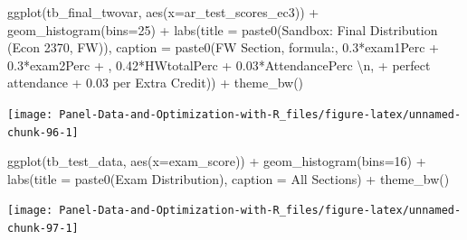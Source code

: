 \documentclass[
]{book}
\newenvironment{Shaded}{\begin{snugshade}}{\end{snugshade}}
\newcommand{\AttributeTok}[1]{\textcolor[rgb]{0.77,0.63,0.00}{#1}}
\newcommand{\DecValTok}[1]{\textcolor[rgb]{0.00,0.00,0.81}{#1}}
\newcommand{\FunctionTok}[1]{\textcolor[rgb]{0.00,0.00,0.00}{#1}}
\newcommand{\NormalTok}[1]{#1}
\newcommand{\SpecialCharTok}[1]{\textcolor[rgb]{0.00,0.00,0.00}{#1}}
\newcommand{\StringTok}[1]{\textcolor[rgb]{0.31,0.60,0.02}{#1}}
\begin{document}
\begin{Shaded}
\begin{Highlighting}[]
\FunctionTok{ggplot}\NormalTok{(tb\_final\_twovar, }\FunctionTok{aes}\NormalTok{(}\AttributeTok{x=}\NormalTok{ar\_test\_scores\_ec3)) }\SpecialCharTok{+}
  \FunctionTok{geom\_histogram}\NormalTok{(}\AttributeTok{bins=}\DecValTok{25}\NormalTok{) }\SpecialCharTok{+}
  \FunctionTok{labs}\NormalTok{(}\AttributeTok{title =} \FunctionTok{paste0}\NormalTok{(}\StringTok{\textquotesingle{}Sandbox: Final Distribution (Econ 2370, FW)\textquotesingle{}}\NormalTok{),}
       \AttributeTok{caption =} \FunctionTok{paste0}\NormalTok{(}\StringTok{\textquotesingle{}FW Section, formula:\textquotesingle{}}\NormalTok{,}
                        \StringTok{\textquotesingle{}0.3*exam1Perc + 0.3*exam2Perc + \textquotesingle{}}\NormalTok{,}
                        \StringTok{\textquotesingle{}0.42*HWtotalPerc + 0.03*AttendancePerc }\SpecialCharTok{\textbackslash{}n}\StringTok{\textquotesingle{}}\NormalTok{,}
                        \StringTok{\textquotesingle{}+ perfect attendance + 0.03 per Extra Credit\textquotesingle{}}\NormalTok{)) }\SpecialCharTok{+}
  \FunctionTok{theme\_bw}\NormalTok{()}
\end{Highlighting}
\end{Shaded}

\begin{center}\texttt{[image: Panel-Data-and-Optimization-with-R\_files/figure-latex/unnamed-chunk-96-1]} \end{center}

\begin{Shaded}
\begin{Highlighting}[]
\FunctionTok{ggplot}\NormalTok{(tb\_test\_data, }\FunctionTok{aes}\NormalTok{(}\AttributeTok{x=}\NormalTok{exam\_score)) }\SpecialCharTok{+}
  \FunctionTok{geom\_histogram}\NormalTok{(}\AttributeTok{bins=}\DecValTok{16}\NormalTok{) }\SpecialCharTok{+}
  \FunctionTok{labs}\NormalTok{(}\AttributeTok{title =} \FunctionTok{paste0}\NormalTok{(}\StringTok{\textquotesingle{}Exam Distribution\textquotesingle{}}\NormalTok{),}
       \AttributeTok{caption =} \StringTok{\textquotesingle{}All Sections\textquotesingle{}}\NormalTok{) }\SpecialCharTok{+}
  \FunctionTok{theme\_bw}\NormalTok{()}
\end{Highlighting}
\end{Shaded}

\begin{center}\texttt{[image: Panel-Data-and-Optimization-with-R\_files/figure-latex/unnamed-chunk-97-1]} \end{center}
\end{document}

